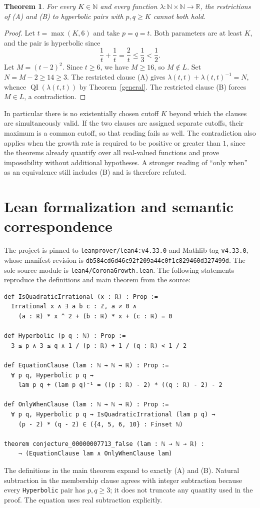 \documentclass[11pt]{article}
\newtheorem{theorem}{Theorem}
\newcommand{\QI}{\operatorname{QI}}
\begin{document}
\begin{theorem}\label{tail}
For every $K\in\mathbb N$ and every function
$\lambda:\mathbb N\times\mathbb N\to\mathbb R$, the restrictions of
(A) and (B) to hyperbolic pairs with $p,q\ge K$ cannot both hold.
\end{theorem}
\begin{proof}
Let $t=\max(K,6)$ and take $p=q=t$. Both parameters are at least $K$,
and the pair is hyperbolic since
\[
\frac1t+\frac1t=\frac2t\le\frac13<\frac12.
\]
Let $M=(t-2)^2$. Since $t\ge6$, we have $M\ge16$, so $M\notin L$.
Set $N=M-2\ge14\ge3$. The restricted clause (A) gives
$\lambda(t,t)+\lambda(t,t)^{-1}=N$, whence
$\QI(\lambda(t,t))$ by Theorem~\ref{general}.
The restricted clause (B) forces $M\in L$, a contradiction.
\end{proof}

In particular there is no existentially chosen cutoff $K$ beyond which the
clauses are simultaneously valid. If the two clauses are assigned separate
cutoffs, their maximum is a common cutoff, so that reading fails as well.
The contradiction also applies when the growth rate is required to be
positive or greater than $1$, since the theorems already quantify over all
real-valued functions and prove impossibility without additional hypotheses.
A stronger reading of ``only when'' as an equivalence still includes (B)
and is therefore refuted.

\section{Lean formalization and semantic correspondence}
The project is pinned to \texttt{leanprover/lean4:v4.33.0} and Mathlib tag
\texttt{v4.33.0}, whose manifest revision is
\texttt{db584cd6d46c92f209a44c0f1c829460d327499d}.
The sole source module is \texttt{lean4/CoronaGrowth.lean}. The following
statements reproduce the definitions and main theorem from the source:
\begin{lstlisting}
def IsQuadraticIrrational (x : ℝ) : Prop :=
  Irrational x ∧ ∃ a b c : ℤ, a ≠ 0 ∧
    (a : ℝ) * x ^ 2 + (b : ℝ) * x + (c : ℝ) = 0

def Hyperbolic (p q : ℕ) : Prop :=
  3 ≤ p ∧ 3 ≤ q ∧ 1 / (p : ℝ) + 1 / (q : ℝ) < 1 / 2

def EquationClause (lam : ℕ → ℕ → ℝ) : Prop :=
  ∀ p q, Hyperbolic p q →
    lam p q + (lam p q)⁻¹ = ((p : ℝ) - 2) * ((q : ℝ) - 2) - 2

def OnlyWhenClause (lam : ℕ → ℕ → ℝ) : Prop :=
  ∀ p q, Hyperbolic p q → IsQuadraticIrrational (lam p q) →
    (p - 2) * (q - 2) ∈ ({4, 5, 6, 10} : Finset ℕ)

theorem conjecture_00000007713_false (lam : ℕ → ℕ → ℝ) :
    ¬ (EquationClause lam ∧ OnlyWhenClause lam)
\end{lstlisting}
The definitions in the main theorem expand to exactly (A) and (B).
Natural subtraction in the membership clause agrees with integer subtraction
because every \texttt{Hyperbolic} pair has $p,q\ge3$; it does not truncate any
quantity used in the proof. The equation uses real subtraction explicitly.
\end{document}
